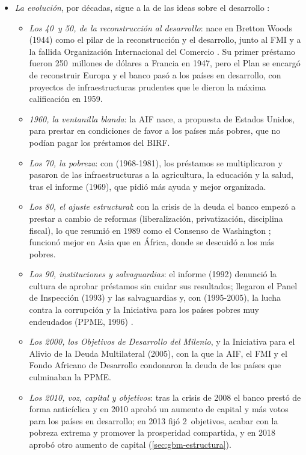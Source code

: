 \documentclass[11pt]{article}
\begin{document}
\begin{itemize}
\item \emph{La evolución}, por décadas, sigue a la de las ideas sobre el desarrollo :
  \begin{itemize}
  \item \emph{Los 40~y 50, de la reconstrucción al desarrollo}: nace en Bretton Woods (1944) como el pilar de la reconstrucción y el desarrollo, junto al FMI y a la fallida Organización Internacional del Comercio . Su primer préstamo fueron 250~millones de dólares a Francia en 1947, pero el Plan  se encargó de reconstruir Europa y el banco pasó a los países en desarrollo, con proyectos de infraestructuras prudentes que le dieron la máxima calificación en 1959\nocite{BM2026Historia}.
  \item \emph{1960, la ventanilla blanda}: la AIF nace, a propuesta de Estados Unidos, para prestar en condiciones de favor a los países más pobres, que no podían pagar los préstamos del BIRF\nocite{KapurLewisWebb1997}.
  \item \emph{Los 70, la pobreza}: con  (1968-1981), los préstamos se multiplicaron y pasaron de las infraestructuras a la agricultura, la educación y la salud, tras el informe  (1969), que pidió más ayuda y mejor organizada.
  \item \emph{Los 80, el ajuste estructural}: con la crisis de la deuda el banco empezó a prestar a cambio de reformas (liberalización, privatización, disciplina fiscal), lo que  resumió en 1989 como el Consenso de Washington \nocite{Williamson1990}; funcionó mejor en Asia que en África, donde se descuidó a los más pobres.
  \item \emph{Los 90, instituciones y salvaguardias}: el informe  (1992) denunció la cultura de aprobar préstamos sin cuidar sus resultados; llegaron el Panel de Inspección (1993) y las salvaguardias y, con  (1995-2005), la lucha contra la corrupción y la Iniciativa para los países pobres muy endeudados (PPME, 1996) .
  \item \emph{Los 2000, los Objetivos de Desarrollo del Milenio}, y la Iniciativa para el Alivio de la Deuda Multilateral (2005), con la que la AIF, el FMI y el Fondo Africano de Desarrollo condonaron la deuda de los países que culminaban la PPME.
  \item \emph{Los 2010, voz, capital y objetivos}: tras la crisis de 2008 el banco prestó de forma anticíclica y en 2010 aprobó un aumento de capital y más votos para los países en desarrollo; en 2013 fijó 2~objetivos, acabar con la pobreza extrema y promover la prosperidad compartida, y en 2018 aprobó otro aumento de capital (\ref{sec:gbm-estructura})\nocite{BM2018Capital}.

\end{itemize}
\end{itemize}
\end{document}
